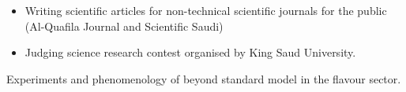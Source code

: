 \documentclass[11pt,article,oneside]{memoir}
\begin{document}
\normalsize

\bigskip
{}
\begin{itemize}
\item Writing scientific articles for non-technical scientific journals for the public (Al-Quafila Journal and
Scientific Saudi)
\item Judging science research contest organised by King Saud University.
\end{itemize}
\normalsize

\bigskip
{}
Experiments and phenomenology of beyond standard model in the flavour sector.
\end{document}
